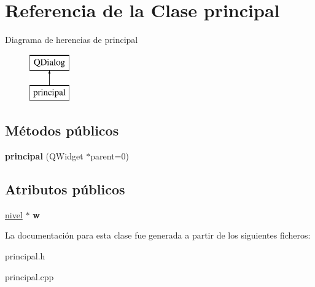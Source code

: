 \hypertarget{classprincipal}{\section{Referencia de la Clase principal}
\label{classprincipal}
}
Diagrama de herencias de principal\begin{figure}[H]
\begin{center}
\leavevmode
\includegraphics[height=2.000000cm]{classprincipal}
\end{center}
\end{figure}
\subsection*{Métodos públicos}
\begin{DoxyCompactItemize}
\item 
\hypertarget{classprincipal_ab8fd3ebc6c6e93eae9d1ae4ae013cbef}{{\bfseries principal} (Q\-Widget $\ast$parent=0)}\label{classprincipal_ab8fd3ebc6c6e93eae9d1ae4ae013cbef}

\end{DoxyCompactItemize}
\subsection*{Atributos públicos}
\begin{DoxyCompactItemize}
\item 
\hypertarget{classprincipal_a23d9843a5cd1fdd39bfa2aed8f2823ab}{\hyperlink{classnivel}{nivel} $\ast$ {\bfseries w}}\label{classprincipal_a23d9843a5cd1fdd39bfa2aed8f2823ab}

\end{DoxyCompactItemize}


La documentación para esta clase fue generada a partir de los siguientes ficheros\-:\begin{DoxyCompactItemize}
\item 
principal.\-h\item 
principal.\-cpp\end{DoxyCompactItemize}
